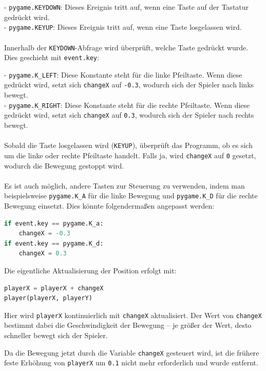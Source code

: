 \documentclass{article}
\begin{document}
- \texttt{pygame.KEYDOWN}: Dieses Ereignis tritt auf, wenn eine Taste auf der Tastatur gedrückt wird.\\
- \texttt{pygame.KEYUP}: Dieses Ereignis tritt auf, wenn eine Taste losgelassen wird.\\
\\
Innerhalb der \texttt{KEYDOWN}-Abfrage wird überprüft, welche Taste gedrückt wurde. Dies geschieht mit \texttt{event.key}:

- \texttt{pygame.K\_LEFT}: Diese Konstante steht für die linke Pfeiltaste. Wenn diese gedrückt wird, setzt sich \texttt{changeX} auf \texttt{-0.3}, wodurch sich der Spieler nach links bewegt.\\
- \texttt{pygame.K\_RIGHT}: Diese Konstante steht für die rechte Pfeiltaste. Wenn diese gedrückt wird, setzt sich \texttt{changeX} auf \texttt{0.3}, wodurch sich der Spieler nach rechts bewegt.\\
\\
Sobald die Taste losgelassen wird (\texttt{KEYUP}), überprüft das Programm, ob es sich um die linke oder rechte Pfeiltaste handelt. Falls ja, wird \texttt{changeX} auf \texttt{0} gesetzt, wodurch die Bewegung gestoppt wird.\\
\\
Es ist auch möglich, andere Tasten zur Steuerung zu verwenden, indem man beispielsweise \texttt{pygame.K\_A} für die linke Bewegung und \texttt{pygame.K\_D} für die rechte Bewegung einsetzt. Dies könnte folgendermaßen angepasst werden:

\begin{lstlisting}[style=pythonstyle, language=Python, backgroundcolor=\color{white}]
if event.key == pygame.K_a:
    changeX = -0.3
if event.key == pygame.K_d:
    changeX = 0.3
\end{lstlisting}

Die eigentliche Aktualisierung der Position erfolgt mit:

\begin{lstlisting}[style=pythonstyle, language=Python]
playerX = playerX + changeX
player(playerX, playerY)
\end{lstlisting}

Hier wird \texttt{playerX} kontinuierlich mit \texttt{changeX} aktualisiert. Der Wert von \texttt{changeX} bestimmt dabei die Geschwindigkeit der Bewegung – je größer der Wert, desto schneller bewegt sich der Spieler. 

Da die Bewegung jetzt durch die Variable \texttt{changeX} gesteuert wird, ist die frühere feste Erhöhung von \texttt{playerX} um \texttt{0.1} nicht mehr erforderlich und wurde entfernt.
\end{document}
